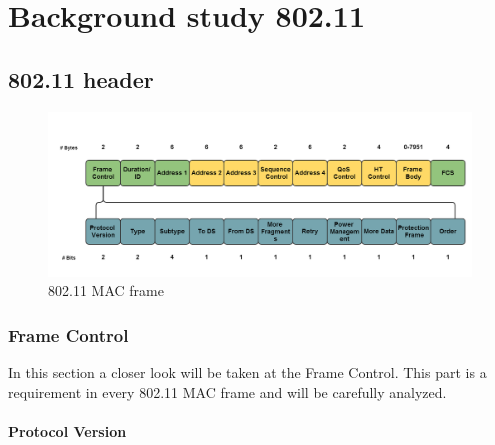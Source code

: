 \chapter{Background study 802.11}

\section{802.11 header} %


\begin{figure}[H]
    \centering
    \includegraphics[width=1\textwidth]{figures/80211macframe}
    \caption{802.11 MAC frame} 
    \label{fig:80211macframe_bg}
\end{figure}


\subsection{Frame Control}

In this section a closer look will be taken at the Frame Control. This part is a requirement in every 802.11 MAC frame and will be carefully analyzed. 

\subsubsection{Protocol Version}

